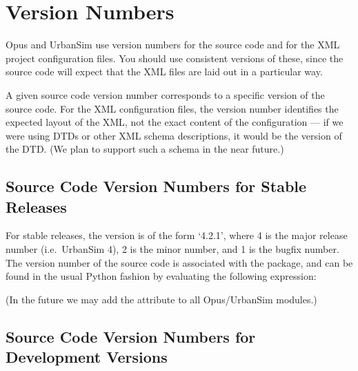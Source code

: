 
\chapter{Version Numbers}
\label{appendix:version-numbers}

Opus and UrbanSim use version numbers for the source code and for the XML
project configuration files.  You should use consistent versions of these,
since the source code will expect that the XML files are laid out in a
particular way.

A given source code version number corresponds to a specific version of the
source code.  For the XML configuration files, the version number
identifies the expected layout of the XML, not the exact content of the
configuration --- if we were using DTDs or other XML schema descriptions,
it would be the version of the DTD\@.  (We plan to support such a schema in
the near future.)

\section{Source Code Version Numbers for Stable Releases}

For stable releases, the version is of the form `4.2.1', where 4 is the
major release number (i.e.\ UrbanSim 4), 2 is the minor number, and 1 is
the bugfix number.  The version number of the source code is associated
with the  package, and can be found in the usual Python
fashion by evaluating the following expression:


(In the future we may add the  attribute to all
Opus/UrbanSim modules.)

\section{Source Code Version Numbers for Development Versions}

